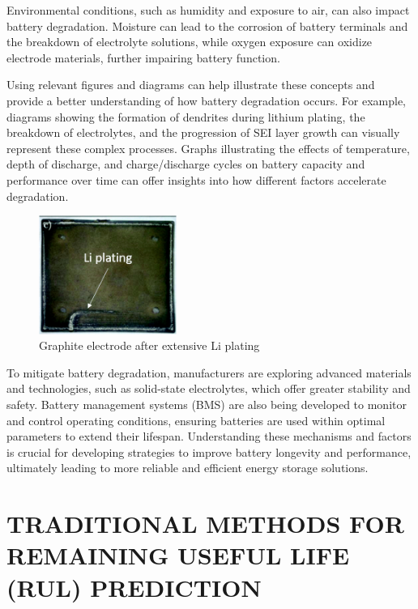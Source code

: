 Environmental conditions, such as humidity and exposure to air, can also impact battery degradation. Moisture can lead to the corrosion of battery terminals and the breakdown of electrolyte solutions, while oxygen exposure can oxidize electrode materials, further impairing battery function. 

Using relevant figures and diagrams can help illustrate these concepts and provide a better understanding of how battery degradation occurs. For example, diagrams showing the formation of dendrites during lithium plating, the breakdown of electrolytes, and the progression of SEI layer growth can visually represent these complex processes. Graphs illustrating the effects of temperature, depth of discharge, and charge/discharge cycles on battery capacity and performance over time can offer insights into how different factors accelerate degradation. 

\begin{figure}[h]
    \centering
    \includegraphics[width=0.4\textwidth]{d1cp00359c-f3_hi-res.jpg}
    \caption{Graphite electrode after extensive Li plating}
    \label{fig:graphite-electrode}
\end{figure}

To mitigate battery degradation, manufacturers are exploring advanced materials and technologies, such as solid-state electrolytes, which offer greater stability and safety. Battery management systems (BMS) are also being developed to monitor and control operating conditions, ensuring batteries are used within optimal parameters to extend their lifespan. Understanding these mechanisms and factors is crucial for developing strategies to improve battery longevity and performance, ultimately leading to more reliable and efficient energy storage solutions.


\chapter{TRADITIONAL METHODS FOR REMAINING USEFUL LIFE (RUL) PREDICTION}

